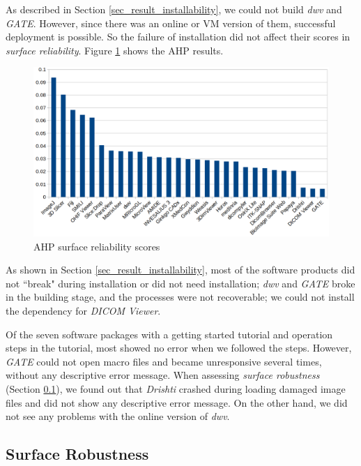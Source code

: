 \documentclass[preprint,12pt,authoryear]{elsarticle}
\begin{document}
As described in Section \ref{sec_result_installability}, we could not build
\textit{dwv} and \textit{GATE}. However, since there was an online or VM version
of them, successful deployment is possible. So the failure of installation did
not affect their scores in \textit{surface reliability}. Figure
\ref{fg_reliability_scores} shows the AHP results.

\begin{figure}[ht]
\includegraphics[scale=0.38]{figures/reliability_scores.png}
\caption{AHP surface reliability scores}
\label{fg_reliability_scores}
\end{figure}

As shown in Section \ref{sec_result_installability}, most of the software
products did not ``break" during installation or did not need installation;
\textit{dwv} and \textit{GATE} broke in the building stage, and the processes
were not recoverable; we could not install the dependency for \textit{DICOM
Viewer}.

Of the seven software packages with a getting started tutorial and operation
steps in the tutorial, most showed no error when we followed the steps. However,
\textit{GATE} could not open macro files and became unresponsive several times,
without any descriptive error message. When assessing \textit{surface
robustness} (Section \ref{sec_result_robustness}), we found out that
\textit{Drishti} crashed during loading damaged image files and did not show any
descriptive error message. On the other hand, we did not see any problems with
the online version of \textit{dwv}.

\subsection{Surface Robustness} \label{sec_result_robustness}
\end{document}
